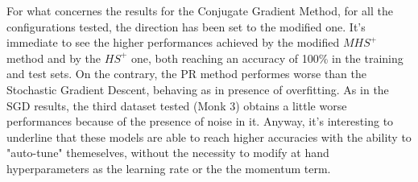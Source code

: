         For what concernes the results for the Conjugate Gradient Method, for all the configurations tested,
        the direction has been set to the modified one. It's immediate to see the higher performances
        achieved by the modified $MHS^+$ method and by the $HS^+$ one, both reaching an accuracy of 100\% in
        the training and test sets. On the contrary, the PR method performes worse than the Stochastic
        Gradient Descent, behaving as in presence of overfitting. As in the SGD results, the third dataset
        tested (Monk 3) obtains a little worse performances because of the presence of noise in it.
        Anyway, it's interesting to underline that these models are able to reach higher accuracies with the
        ability to "auto-tune" themeselves,  without the necessity to modify at hand hyperparameters as the
        learning rate or the the momentum term.


